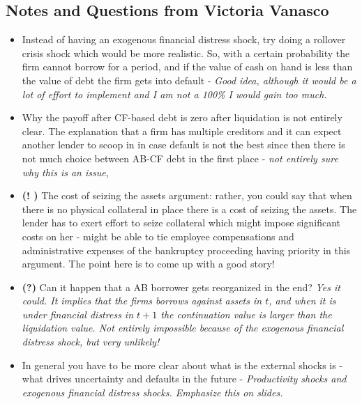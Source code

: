 \documentclass[12pt]{article}
\begin{document}
\subsection*{Notes and Questions from Victoria Vanasco}
\begin{itemize} \setlength\itemsep{0em}  \small
    \item Instead of having an exogenous financial distress shock, try doing a rollover crisis shock which would be more realistic. So, with a certain probability the firm cannot borrow for a period, and if the value of cash on hand is less than the value of debt the firm gets into default - \textit{Good idea, although it would be a lot of effort to implement and I am not a 100\% I would gain too much.}
    \item Why the payoff after CF-based debt is zero after liquidation is not entirely clear. The explanation that a firm has multiple creditors and it can expect another lender to scoop in in case default is not the best since then there is not much choice between AB-CF debt in the first place - \textit{not entirely sure why this is an issue}, 
    \item \textbf{(! \checkmark)} The cost of seizing the assets argument: rather, you could say that when there is no physical collateral in place there is a cost of seizing the assets. The lender has to exert effort to seize collateral which might impose significant costs on her - might be able to tie employee compensations and administrative expenses of the bankruptcy proceeding having priority in this argument. The point here is to come up with a good story!
    \item \textbf{(?)} Can it happen that a AB borrower gets reorganized in the end? \textit{Yes it could. It implies that the firms borrows against assets in $t$, and when it is under financial distress in $t+1$ the continuation value is larger than the liquidation value. Not entirely impossible because of the exogenous financial distress shock, but very unlikely!}
    \item In general you have to be more clear about what is the external shocks is -what drives uncertainty and defaults in the future - \textit{Productivity shocks and exogenous financial distress shocks. Emphasize this on slides.} 
\end{itemize} \normalsize
\end{document}
